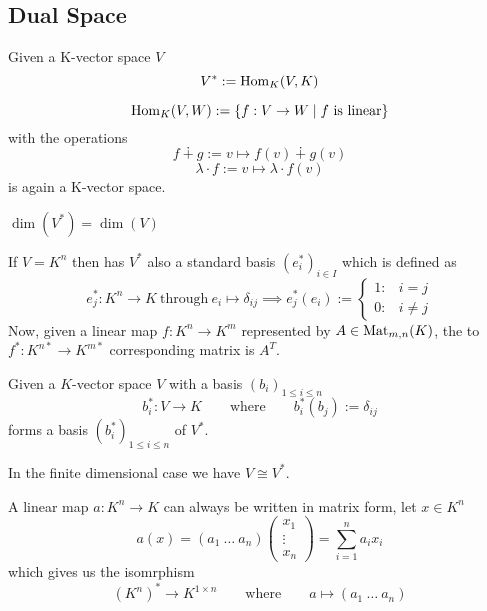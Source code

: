 \subsection{Dual Space}
\begin{definition}
   Given a K-vector space \(V\)
   \[V^* := \operatorname{Hom}_K(V, K)\]
\end{definition}
\begin{example}
   \[\operatorname{Hom}_K(V, W) := \{f: V \to W \mid f~\text{is linear}\}\]
   with the operations
   \[f \dotplus g := v \mapsto f(v) \dotplus g(v)\]
   \[\lambda \cdot f := v \mapsto \lambda \cdot f(v)\]
   is again a K-vector space.
\end{example}
\begin{remark}
   \(\dim(V^*) = \dim(V)\)
\end{remark}
\begin{remark}
   If \(V = K^n\) then has \(V^*\) also a standard basis \((e_{i}^*)_{i \in I}\) which is defined as
   \[e_j^*: K^n \to K~\text{through}~ e_i \mapsto \delta_{ij} \implies
      e^*_j(e_i) := \begin{cases}
         1:& i = j\\
         0:& i \neq j
   \end{cases}\]
   Now, given a linear map \(f: K^n \to K^m\) represented by \(A \in \operatorname{Mat}_{m,n}(K)\), the to \(f^*: K^{n*} \to K^{m*}\) corresponding matrix is \(A^T\).
\end{remark}

\begin{definition}
   Given a \(K\)-vector space \(V\) with a basis \((b_i)_{1 \leq i \leq n}\)
   \[b_i^\ast: V \to K \qquad\text{where}\qquad b_i^\ast(b_j) := \delta_{ij}\]
   forms a basis \((b_i^\ast)_{1 \leq i \leq n}\) of \(V^\ast\).
\end{definition}
\begin{remark}
   In the finite dimensional case we have \(V \cong V^\ast\).
\end{remark}
\begin{example}
   A linear map \(a: K^n \to K\) can always be written in matrix form, let \(x \in K^n\)
   \[a(x) = (a_1~\ldots~a_n)\begin{pmatrix}x_1\\\vdots\\x_n\end{pmatrix} = \sum_{i=1}^n a_ix_i\]
   which gives us the isomrphism
   \[(K^n)^\ast \to K^{1 \times n} \qquad\text{where}\qquad a \mapsto (a_1~\ldots~a_n)\]
\end{example}

